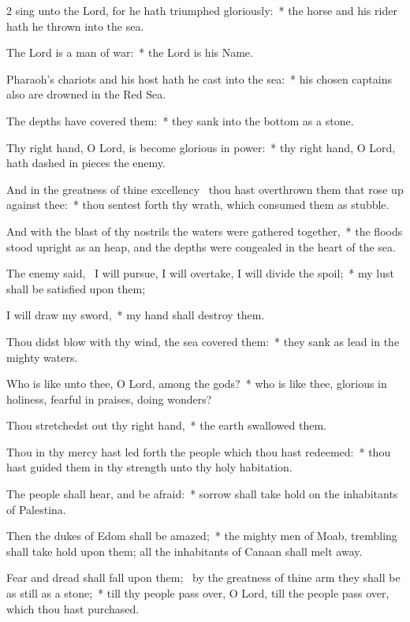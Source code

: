\begin{multicols}{2}
 sing unto the Lord, for he hath triumphed gloriously:~* the horse and his rider hath he thrown into the sea.\par
{}
The Lord is a man of war:~* the Lord is his Name.\par
Pharaoh’s chariots and his host hath he cast into the sea:~* his chosen captains also are drowned in the Red Sea.\par
The depths have covered them:~* they sank into the bottom as a stone.\par
Thy right hand, O Lord, is become glorious in power:~* thy right hand, O Lord, hath dashed in pieces the enemy.\par
And in the greatness of thine excellency~{\dag} thou hast overthrown them that rose up against thee:~* thou sentest forth thy wrath, which consumed them as stubble.\par
And with the blast of thy nostrils the waters were gathered together,~* the floods stood upright as an heap, and the depths were congealed in the heart of the sea.\par
The enemy said,~{\dag} I will pursue, I will overtake, I will divide the spoil;~* my lust shall be satisfied upon them;\par
I will draw my sword,~* my hand shall destroy them.\par
Thou didst blow with thy wind, the sea covered them:~* they sank as lead in the mighty waters.\par
Who is like unto thee, O Lord, among the gods?~* who is like thee, glorious in holiness, fearful in praises, doing wonders?\par
Thou stretchedst out thy right hand,~* the earth swallowed them.\par
Thou in thy mercy hast led forth the people which thou hast redeemed:~* thou hast guided them in thy strength unto thy holy habitation.\par
The people shall hear, and be afraid:~* sorrow shall take hold on the inhabitants of Palestina.\par
Then the dukes of Edom shall be amazed;~* the mighty men of Moab, trembling shall take hold upon them; all the inhabitants of Canaan shall melt away.\par
Fear and dread shall fall upon them;~{\dag} by the greatness of thine arm they shall be as still as a stone;~* till thy people pass over, O Lord, till the people pass over, which thou hast purchased.\par

\end{multicols}
